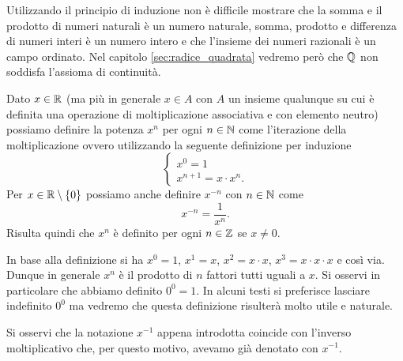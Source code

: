 
Utilizzando il principio di induzione non è difficile mostrare che
la somma e il prodotto di numeri naturali è un numero naturale,
somma, prodotto e differenza
di numeri interi è un numero intero e che l'insieme dei numeri
razionali è un campo ordinato.
Nel capitolo \ref{sec:radice_quadrata}
vedremo però che $\mathbb Q$ non soddisfa l'assioma di continuità.

\begin{definition}
\label{def:potenza_intera}%
%
Dato $x \in \mathbb R$ (ma più in generale $x\in A$ con $A$ un insieme qualunque su
cui è definita una operazione di moltiplicazione associativa e con elemento
neutro) possiamo definire la potenza $x^n$ per ogni
$n\in \mathbb N$ come l'iterazione della moltiplicazione
ovvero utilizzando
la seguente definizione per induzione
\[
\begin{cases}
  x^0 = 1\\
  x^{n+1} = x\cdot x^n.
\end{cases}
\]
Per $x\in \mathbb R\setminus{\left\{ 0 \right\}}$ possiamo anche definire $x^{-n}$ con $n\in \mathbb N$
come
\[
x^{-n} = \frac{1}{x^n}.
\]
Risulta quindi che $x^n$ è definito per ogni $n\in \mathbb Z$ se $x\neq 0$.
\end{definition}

In base alla definizione si ha $x^0 = 1$, $x^1=x$, $x^2=x\cdot x$,
$x^3=x\cdot x \cdot x$ e così via. Dunque in generale
$x^n$ è il prodotto di $n$ fattori tutti uguali a $x$.
Si osservi in particolare che abbiamo definito $0^0=1$.
In alcuni testi si preferisce lasciare indefinito $0^0$
ma vedremo che questa definizione risulterà
molto utile e naturale.

Si osservi che la notazione
$x^{-1}$ appena introdotta coincide
con l'inverso moltiplicativo che, per questo motivo, avevamo già denotato
con $x^{-1}$.

